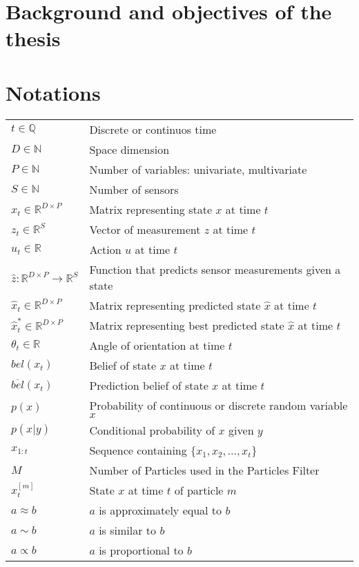 \section{Background and objectives of the thesis}

\section{Notations}
\begin{flushleft}
\begin{tabular}{l l}

$t \in \mathbb{Q}$ & Discrete or continuos time\\
$D \in \mathbb{N}$ & Space dimension\\
$P \in \mathbb{N}$ & Number of variables: univariate, multivariate\\
$S \in \mathbb{N}$ & Number of sensors\\
$x_t \in \mathbb{R}^{D\times P}$ & Matrix representing state $x$ at time $t$\\
$z_t \in \mathbb{R}^S$  & Vector of measurement $z$ at time $t$\\
$u_t \in \mathbb{R}$ & Action $u$ at time $t$\\
$\hat z: \mathbb{R}^{D\times P}  \rightarrow \mathbb{R}^S $ & Function that predicts sensor measurements given a state\\
$\hat x_t \in \mathbb{R}^{D\times P}$ & Matrix representing predicted state $\hat x$ at time $t$\\
$\hat x_t^* \in \mathbb{R}^{D\times P}$ & Matrix representing best predicted state $\hat x$ at time $t$\\
$\theta_t \in \mathbb{R}$ & Angle of orientation at time $t$\\
$bel(x_t)$ & Belief of state $x$ at time $t$\\
$\overline{bel}(x_t)$ & Prediction belief of state $x$ at time $t$\\
$p(x)$ & Probability of continuous or discrete random variable $x$\\
$p(x | y)$ & Conditional probability of $x$ given $y$\\
$x_{1:t}$ & Sequence containing $\{x_1, x_2, ..., x_t\}$\\ 
$M$ & Number of Particles used in the Particles Filter\\
$x_t^{[m]}$ & State $x$ at time $t$ of particle $m$\\
$a \approx b$ & $a$ is approximately equal to $b$\\
$a \sim b$ & $a$ is similar to $b$\\
$a \propto b$ & $a$ is proportional to $b$\\
\end{tabular}
\end{flushleft}

